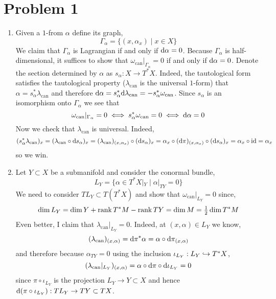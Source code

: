 \documentclass[12pt]{article}
\begin{document}

\newcommand{\can}{\mathrm{can}}

\section{Problem 1}

\begin{enumerate}
\item Given a $1$-from $\alpha$ define its graph,
\[ \Gamma_\alpha = \{ (x, \alpha_x) \mid x \in X \} \]
We claim that $\Gamma_\alpha$ is Lagrangian if and only if $\mathrm{d}{\alpha} = 0$.
Because $\Gamma_\alpha$ is half-dimensional, it suffices to show that $\omega_{\can}|_{\Gamma_\alpha} = 0$ if and only if $\mathrm{d}{\alpha} = 0$. Denote the section determined by $\alpha$ as $s_\alpha : X \to T^*X$. Indeed, the tautological form satisfies the tautological property ($\lambda_{\can}$ is the universal $1$-form) that $\alpha = s_\alpha^* \lambda_{\can}$ and therefore $\d{\alpha} = s_\alpha^* \d{\lambda_{\can}} = - s_{\alpha}^* \omega_{\can}$. Since $s_\alpha$ is an isomorphism onto $\Gamma_\alpha$ we see that 
\[ \omega_{\can} |_{\Gamma_\alpha} = 0 \iff s_\alpha^* \omega_{\can} = 0 \iff \d{\alpha} = 0 \]
Now we check that $\lambda_{\can}$ is universal. Indeed, 
\[ (s_\alpha^* \lambda_{\can})_x = (\lambda_{\can} \circ \d{s_\alpha})_x = (\lambda_{\can})_{(x, \alpha_x)} \circ (\d{s_\alpha})_x = \alpha_x \circ (\d{\pi})_{(x, \alpha_x)} \circ (\d{s_{\alpha}})_x = \alpha_x \circ \id = \alpha_x \]
so we win. 

\item Let $Y \subset X$ be a submanifold and consider the conormal bundle,
\[ L_Y = \{ \alpha \in T^* X |_Y \mid \alpha|_{TY} = 0 \} \]
We need to consider $T L_Y \subset T(T^* X)$ and show that $\omega_{\can}|_{L_Y} = 0$ since,
\[ \dim{L_Y} = \dim{Y} + \operatorname{\mathrm{rank}}{T^*M} - \operatorname{\mathrm{rank}}{TY} = \dim{M} = \tfrac{1}{2} \dim{T^* M} \] 
Even better, I claim that $\lambda_{\can} |_{L_Y} = 0$. Indeed, at $(x, \alpha) \in L_Y$ we know,
\[ (\lambda_{\can})_{(x, \alpha)} = \d{\pi}^* \alpha = \alpha \circ \d{\pi}_{(x, \alpha)} \]
and therefore because $\alpha_{TY} = 0$ using the inclusion $\iota_{L_Y} : L_Y \hookrightarrow T^*X$,
\[ (\lambda_{\can} |_{L_Y})_{(x, \alpha)} = \alpha \circ \d{\pi} \circ \d{\iota_{L_Y}} = 0 \]
since $\pi \circ \iota_{L_Y}$ is the projection $L_Y \to Y \subset X$ and hence $\mathrm{d}{(\pi \circ \iota_{L_Y})} : T L_Y \to TY \subset TX$.


\end{enumerate}
\end{document}
